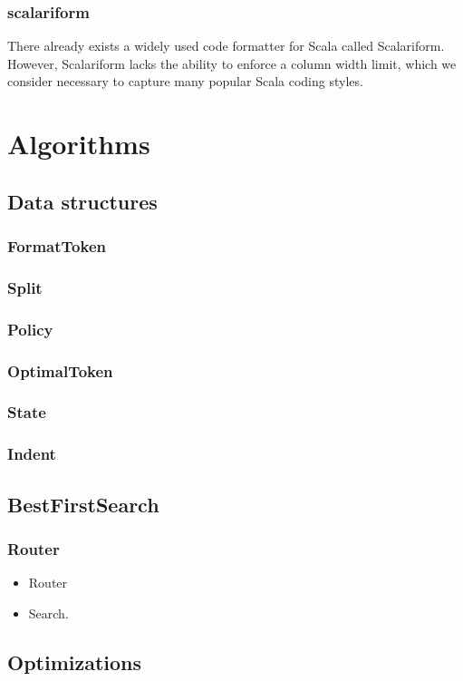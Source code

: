 \documentclass[11pt,a4paper]{article}
\begin{document}
\subsubsection{scalariform}
There already exists a widely used code formatter for Scala called Scalariform\autocite{scalariform}.
However, Scalariform lacks the ability to enforce a column width limit,
which we consider necessary to capture many popular Scala coding styles.
\section{Algorithms}\label{sec:algorithms}
\subsection{Data structures}
\subsubsection{FormatToken}
\subsubsection{Split}
\subsubsection{Policy}
\subsubsection{OptimalToken}
\subsubsection{State}
\subsubsection{Indent}
\subsection{BestFirstSearch}
\subsubsection{Router}
\begin{itemize}
  \item Router
  \item Search.
\end{itemize}
\subsection{Optimizations}
\end{document}
